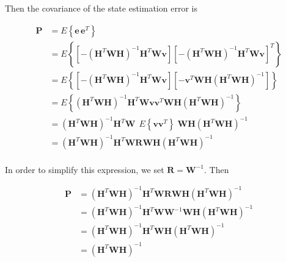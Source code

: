 Then the covariance of the state estimation error is

\begin{equation*}
    \begin{aligned}
        \mathbf{P} &= E \left\{ \mathbf{e} \, \mathbf{e}^T \right\} \\
        &= E \left\{ \left[ - \left( \mathbf{H}^T \mathbf{W} \mathbf{H} \right)^{-1} \mathbf{H}^T \mathbf{W} \mathbf{v} \right]
           \left[ - \left( \mathbf{H}^T \mathbf{W} \mathbf{H} \right)^{-1} \mathbf{H}^T \mathbf{W} \mathbf{v} \right]^T \right\} \\
        &= E \left\{ \left[ - \left( \mathbf{H}^T \mathbf{W} \mathbf{H} \right)^{-1} \mathbf{H}^T \mathbf{W} \mathbf{v} \right]
           \left[ - \mathbf{v}^T \mathbf{W} \mathbf{H} \left( \mathbf{H}^T \mathbf{W} \mathbf{H} \right)^{-1} \right] \right\} \\
        &= E \left\{ \left( \mathbf{H}^T \mathbf{W} \mathbf{H} \right)^{-1} \mathbf{H}^T \mathbf{W} \mathbf{v}
           \mathbf{v}^T \mathbf{W} \mathbf{H} \left( \mathbf{H}^T \mathbf{W} \mathbf{H} \right)^{-1} \right\} \\
        &= \left( \mathbf{H}^T \mathbf{W} \mathbf{H} \right)^{-1} \mathbf{H}^T \mathbf{W}
           \;\, E \left\{ \mathbf{v} \mathbf{v}^T \right\} \;
           \mathbf{W} \mathbf{H} \left( \mathbf{H}^T \mathbf{W} \mathbf{H} \right)^{-1} \\
        &= \left( \mathbf{H}^T \mathbf{W} \mathbf{H} \right)^{-1} \mathbf{H}^T \mathbf{W}
           \mathbf{R}
           \mathbf{W} \mathbf{H} \left( \mathbf{H}^T \mathbf{W} \mathbf{H} \right)^{-1} \\
    \end{aligned}
\end{equation*}

In order to simplify this expression, we set $\mathbf{R} = \mathbf{W}^{-1}$. Then

\begin{equation*}
    \begin{aligned}
        \mathbf{P}
        &= \left( \mathbf{H}^T \mathbf{W} \mathbf{H} \right)^{-1}
           \mathbf{H}^T \mathbf{W} \mathbf{R} \mathbf{W} \mathbf{H}
           \left( \mathbf{H}^T \mathbf{W} \mathbf{H} \right)^{-1} \\
        &= \left( \mathbf{H}^T \mathbf{W} \mathbf{H} \right)^{-1}
           \mathbf{H}^T \mathbf{W} \mathbf{W}^{-1} \mathbf{W} \mathbf{H}
           \left( \mathbf{H}^T \mathbf{W} \mathbf{H} \right)^{-1} \\
        &= \left( \mathbf{H}^T \mathbf{W} \mathbf{H} \right)^{-1}
           \mathbf{H}^T \mathbf{W} \mathbf{H}
           \left( \mathbf{H}^T \mathbf{W} \mathbf{H} \right)^{-1} \\
        &= \left( \mathbf{H}^T \mathbf{W} \mathbf{H} \right)^{-1}  \\
    \end{aligned}
\end{equation*}

